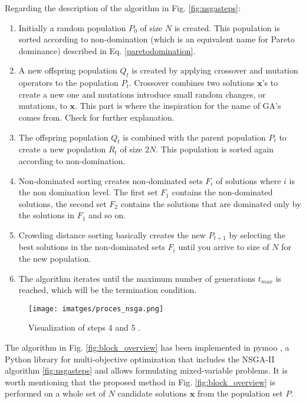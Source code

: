 \documentclass[a4paper,11pt, titlepage, twoside]{article}
\begin{document}
Regarding the description of the algorithm in Fig. \ref{fig:nsgasteps}:
\begin{enumerate}
    \item Initially a random population $P_0$ of size $N$ is created. This population is sorted according to non-domination (which is an equivalent name for Pareto dominance) described in  Eq. \ref{paretodomination}.
    \item A new offspring population $Q_t$ is created by applying crossover and mutation operators to the population $P_t$. Crossover combines two solutions $\mathbf{x}$'s to create a new one and mutations introduce small random changes, or mutations, to $\mathbf{x}$.
    This part is where the inspiration for the name of GA's comes from. Check \cite{NSGAII} for further explanation.
    \item The offspring population $Q_t$ is combined with the parent population $P_t$ to create a new population $R_t$ of size $2N$. This population is sorted again according to non-domination.
    \item Non-dominated sorting creates non-dominated sets $F_i$ of solutions where $i$ is the non domination level.
    The first set $F_1$ contains the non-dominated solutions, the second set $F_2$ contains the solutions that are dominated only by the solutions in $F_1$ and so on.
    \item Crowding distance sorting basically creates the new $P_{t+1}$ by selecting the best solutions in the non-dominated sets $F_i$ until you arrive to size of $N$ for the new population.
    \item The algorithm iterates until the maximum number of generations $t_{max}$ is reached, which will be the termination condition.

\end{enumerate}

\begin{figure}[H]
    \centering
    \texttt{[image: imatges/proces\_nsga.png]}
    \caption{Visualization of steps 4 and 5 \cite{NSGAII}.}
    \label{fig:stpesnsga}
\end{figure}

The algorithm in Fig. \ref{fig:block_overview} has been implemented in pymoo \cite{pymoo}, a Python library for multi-objective optimization that includes the NSGA-II algorithm \ref{fig:nsgasteps} and allows formulating mixed-variable problems.
It is worth mentioning that the proposed method in Fig. \ref{fig:block_overview} is performed on a whole set of $N$ candidate solutions $\mathbf{x}$ from the population set $P$.
\end{document}
